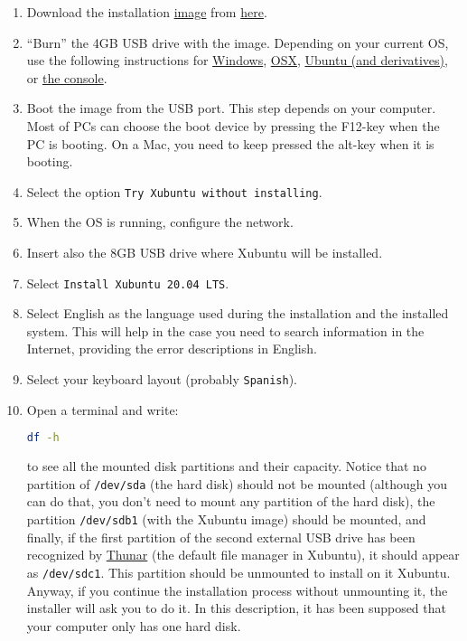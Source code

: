 \begin{enumerate}
  \item Download the
    installation \href{https://en.wikipedia.org/wiki/Disk_image}{image}
    from \href{https://xubuntu.org/download/}{here}.
    
  \item ``Burn'' the 4GB USB drive with the image. Depending on your
    current OS, use the following instructions
    for \href{https://ubuntu.com/tutorials/create-a-usb-stick-on-windows#1-overview}{Windows}, \href{https://ubuntu.com/tutorials/create-a-usb-stick-on-macos#1-overview}{OSX}, \href{https://ubuntu.com/tutorials/create-a-usb-stick-on-ubuntu#1-overview}{Ubuntu
    (and derivatives)},
    or \href{https://askubuntu.com/questions/372607/how-to-create-a-bootable-ubuntu-usb-flash-drive-from-terminal}{the
    console}.

\item Boot the image from the USB port. This step depends on your
  computer. Most of PCs can choose the boot device by pressing the
  F12-key when the PC is booting. On a Mac, you need to keep pressed
  the alt-key when it is booting.
  
\item Select the option \texttt{Try Xubuntu without installing}.
  
\item When the OS is running, configure the network.
  
\item Insert also the 8GB USB drive where Xubuntu will be installed.
  
\item Select \texttt{Install Xubuntu 20.04 LTS}.
  
\item Select English as the language used during the installation and the
  installed system. This will help in the case you need to search
  information in the Internet, providing the error descriptions in
  English.
  
\item Select your keyboard layout (probably \texttt{Spanish}).

\item Open a terminal and write:

  \begin{lstlisting}[language=bash]
    df -h
  \end{lstlisting}

  to see all the mounted disk partitions and their capacity. Notice
  that no partition of \texttt{/dev/sda} (the hard disk) should not be
  mounted (although you can do that, you don't need to mount any
  partition of the hard disk), the partition \texttt{/dev/sdb1} (with
  the Xubuntu image) should be mounted, and finally, if the first
  partition of the second external USB drive has been recognized by
  \href{https://gitlab.xfce.org/xfce/thunar}{Thunar} (the default file
  manager in Xubuntu), it should appear as \texttt{/dev/sdc1}. This
  partition should be unmounted to install on it Xubuntu. Anyway, if
  you continue the installation process without unmounting it, the
  installer will ask you to do it. In this description, it has been
  supposed that your computer only has one hard disk.


\end{enumerate}
